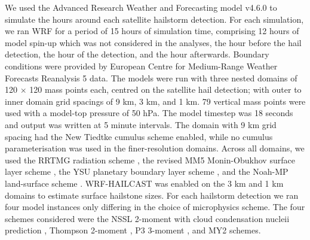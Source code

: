 \documentclass[alpha-refs]{wiley-article}
\begin{document}
We used the Advanced Research Weather and Forecasting model
\citep[AR-WRF,][]{Skamarock_2021} v4.6.0 to simulate the hours around each
satellite hailstorm detection. For each simulation, we ran WRF for a period of
15 hours of simulation time, comprising 12 hours of model spin-up which was not
considered in the analyses, the hour before the hail detection, the hour of the
detection, and the hour afterwards. Boundary conditions were provided by
European Centre for Medium-Range Weather Forecasts Reanalysis 5
\citep[ERA5,][]{Hersbach_QJRMS_2020} data. The models were run with three nested
domains of 120 $\times$ 120 mass points each, centred on the satellite hail
detection; with outer to inner domain grid spacings of 9 km, 3 km, and 1 km. 79
vertical mass points were used with a model-top pressure of 50 hPa. The model
timestep was 18 seconds and output was written at 5 minute intervals. The domain
with 9 km grid spacing had the New Tiedtke \citep{Zhang_JC_2017} cumulus scheme
enabled, while no cumulus parameterisation was used in the finer-resolution
domains. Across all domains, we used the RRTMG radiation scheme
\citep{Iacono_JGRA_2008}, the revised MM5 Monin-Obukhov surface layer scheme
\citep{Jimenez_MWR_2012}, the YSU planetary boundary layer scheme
\citep{Hong_MWR_2006}, and the Noah-MP land-surface scheme
\citep{Niu_JGRA_2011}. WRF-HAILCAST \citep{Adams-Selin_WF_2019} was enabled on
the 3 km and 1 km domains to estimate surface hailstone sizes. For each
hailstorm detection we ran four model instances only differing in the choice of
microphysics scheme. The four schemes considered were the NSSL 2-moment with
cloud condensation nucleii prediction \citep[][]{Mansell_JAS_2010}, Thompson
2-moment \citep{Thompson_MWR_2008}, P3 3-moment \citep[][]{Milbrandt_JAS_2021},
and MY2 \citep{Milbrandt_JAS_2005a, Milbrandt_JAS_2005b} schemes.
\end{document}
